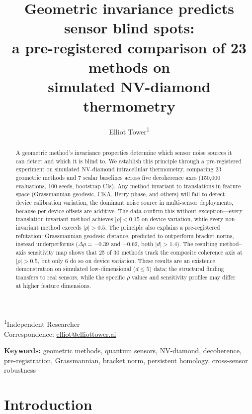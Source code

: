 \documentclass[11pt]{article}
\title{Geometric invariance predicts sensor blind spots:\\
  a pre-registered comparison of 23 methods on\\
  simulated NV-diamond thermometry}
\author{Elliot Tower\textsuperscript{1}}
\date{}
\begin{document}
\maketitle

\noindent\textsuperscript{1}Independent Researcher\\
\noindent Correspondence: \href{mailto:elliot@elliottower.ai}{elliot@elliottower.ai}

\bigskip

\begin{abstract}
A geometric method's invariance properties determine which sensor noise
sources it can detect and which it is blind to.  We establish this
principle through a pre-registered experiment on simulated NV-diamond
intracellular thermometry, comparing 23 geometric methods and 7 scalar
baselines across five decoherence axes (150,000 evaluations, 100 seeds,
bootstrap CIs).  Any method invariant to translations in feature space
(Grassmannian geodesic, CKA, Berry phase, and others) will fail to
detect device calibration variation, the dominant noise source in
multi-sensor deployments, because per-device offsets are additive.  The
data confirm this without exception---every translation-invariant method
achieves $|\rho| < 0.15$ on device variation, while every non-invariant
method exceeds $|\rho| > 0.5$.  The principle also explains a
pre-registered refutation: Grassmannian geodesic distance, predicted to
outperform bracket norms, instead underperforms ($\Delta\rho = -0.39$
and $-0.62$, both $|d| > 1.4$).  The resulting method--axis sensitivity
map shows that 25 of 30 methods track the composite coherence axis at
$|\rho| > 0.5$, but only 6 do so on device variation.  These results
are an existence demonstration on simulated low-dimensional ($d \leq 5$)
data; the structural finding transfers to real sensors, while the
specific $\rho$ values and sensitivity profiles may differ at higher
feature dimensions.
\end{abstract}

\noindent\textbf{Keywords:}
geometric methods, quantum sensors, NV-diamond, decoherence,
pre-registration, Grassmannian, bracket norm, persistent homology,
cross-sensor robustness

\section{Introduction}
\label{sec:intro}
\end{document}
